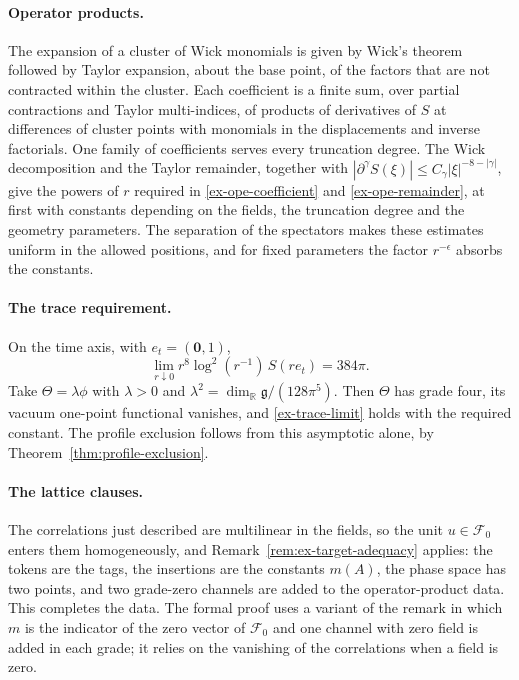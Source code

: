 \paragraph{Operator products.}
The expansion of a cluster of Wick monomials is given by Wick's theorem
followed by Taylor expansion, about the base point, of the factors that are
not contracted within the cluster. Each coefficient is a finite sum, over
partial contractions and Taylor multi-indices, of products of derivatives of
\(S\) at differences of cluster points with monomials in the displacements
and inverse factorials. One family of coefficients serves every truncation
degree. The Wick decomposition and the Taylor remainder, together with
\(|\partial^\gamma S(\xi)|\le C_\gamma|\xi|^{-8-|\gamma|}\), give the powers of
\(r\) required in \eqref{ex-ope-coefficient} and \eqref{ex-ope-remainder},
at first with constants depending on the fields, the truncation degree and
the geometry parameters. The separation of the spectators makes these
estimates uniform in the allowed positions, and for fixed parameters the
factor \(r^{-\epsilon}\) absorbs the constants.

\paragraph{The trace requirement.}
On the time axis, with \(e_t=(\boldsymbol0,1)\),
\[
 \lim_{r\downarrow0}r^8\log^2(r^{-1})\,S(re_t)=384\pi .
\]
Take \(\Theta=\lambda\phi\) with \(\lambda>0\) and
\(\lambda^2=\dim_{\mathbb R}\mathfrak g/(128\pi^5)\). Then \(\Theta\) has grade
four, its vacuum one-point functional vanishes, and \eqref{ex-trace-limit}
holds with the required constant. The profile exclusion follows from this
asymptotic alone, by Theorem~\ref{thm:profile-exclusion}.

\paragraph{The lattice clauses.}
The correlations just described are multilinear in the fields, so the unit
\(u\in\mathcal F_0\) enters them homogeneously, and
Remark~\ref{rem:ex-target-adequacy} applies: the tokens are the tags, the
insertions are the constants \(m(A)\), the phase space has two points, and
two grade-zero channels are added to the operator-product data. This
completes the data. The formal proof uses a variant of the remark in which
\(m\) is the indicator of the zero vector of \(\mathcal F_0\) and one
channel with zero field is added in each grade; it relies on the vanishing
of the correlations when a field is zero.

